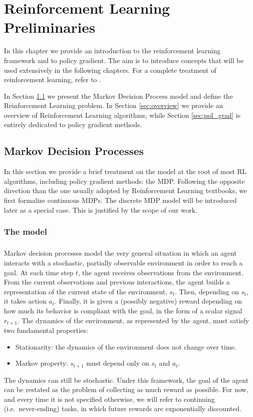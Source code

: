 \chapter{Reinforcement Learning Preliminaries}
In this chapter we provide an introduction to the reinforcement learning framework and to policy gradient.
The aim is to introduce concepts that will be used extensively in the following chapters. For a complete treatment of reinforcement learning, refer to \cite{Sutton:1998:IRL:551283}.

In Section \ref{sec:MDP} we present the Markov Decision Process model and define the Reinforcement Learning problem. In Section \ref{sec:overview} we provide an overview of Reinforcement Learning algorithms, while Section \ref{sec:pol_grad} is entirely dedicated to policy gradient methods.

\section{Markov Decision Processes}\label{sec:MDP}
In this section we provide a brief treatment on the model at the root of most \ac{RL} algorithms, including policy gradient methods: the \ac{MDP}.  
Following the opposite direction than the one usually adopted by Reinforcement Learning textbooks, we first formalize continuous \ac{MDP}s. The discrete \ac{MDP} model will be introduced later as a special case. This is justified by the scope of our work.

\subsection{The model}
\paragraph{} %
Markov decision processes model the very general situation in which an agent interacts with a stochastic, partially observable environment in order to reach a goal. At each time step $t$, the agent receives observations from the environment. From the current observations and previous interactions, the agent builds a representation of the current state of the environment, $s_t$. Then, depending on $s_t$, it takes action $a_t$. Finally, it is given a (possibly negative) reward depending on how much its behavior is compliant with the goal, in the form of a scalar signal $r_{t+1}$. The dynamics of the environment, as represented by the agent, must satisfy two fundamental properties:
\begin{itemize}
\item Stationarity: the dynamics of the environment does not change over time.
\item Markov property: $s_{t+1}$ must depend only on $s_t$ and $a_t$.
\end{itemize}
The dynamics can still be stochastic.
Under this framework, the goal of the agent can be restated as the problem of collecting as much reward as possible. For now, and every time it is not specified otherwise, we will refer to continuing (i.e.\ never-ending) tasks, in which future rewards are exponentially discounted.

